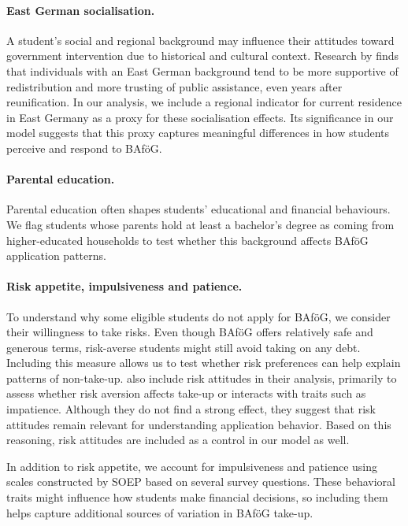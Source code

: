 \paragraph{East German socialisation.}  
A student’s social and regional background may influence their attitudes toward government intervention due to historical and cultural context. Research by \cite{alesina_good-bye_2007} finds that individuals with an East German background tend to be more supportive of redistribution and more trusting of public assistance, even years after reunification. In our analysis, we include a regional indicator for current residence in East Germany as a proxy for these socialisation effects. Its significance in our model suggests that this proxy captures meaningful differences in how students perceive and respond to BAföG.

\paragraph{Parental education.}  
Parental education often shapes students’ educational and financial behaviours. We flag students whose parents hold at least a bachelor’s degree as coming from higher-educated households to test whether this background affects BAföG application patterns.

\paragraph{Risk appetite, impulsiveness and patience.}  

To understand why some eligible students do not apply for BAföG, we consider their willingness to take risks. Even though BAföG offers relatively safe and generous terms, risk-averse students might still avoid taking on any debt. Including this measure allows us to test whether risk preferences can help explain patterns of non-take-up. \cite{herber_non-take-up_2019} also include risk attitudes in their analysis, primarily to assess whether risk aversion affects take-up or interacts with traits such as impatience. Although they do not find a strong effect, they suggest that risk attitudes remain relevant for understanding application behavior. Based on this reasoning, risk attitudes are included as a control in our model as well.

In addition to risk appetite, we account for impulsiveness and patience using scales constructed by SOEP based on several survey questions. These behavioral traits might influence how students make financial decisions, so including them helps capture additional sources of variation in BAföG take-up.




